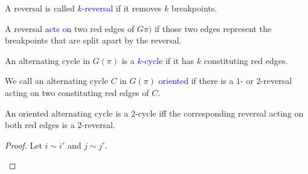 \documentclass{beamer}
\theoremstyle{definition}
\def\spadding{\vspace{0.25cm}}
\def\b{\textcolor{blue}}
\begin{document}
\begin{frame}

\begin{definition}
A reversal is called \b{$k$-reversal} if it removes $k$ breakpoints. \pause\spadding

A reversal \b{acts on} two red edges of $G\pi)$ if those two edges represent the breakpoints that are split apart by the reversal. \pause\spadding

An alternating cycle in $G(\pi)$ is a \b{$k$-cycle} if it has $k$ constituting red edges. \pause\spadding

We call an alternating cycle $C$ in $G(\pi)$ \b{oriented} if there is a $1$- or $2$-reversal acting on two constituting red edges of $C$.
\end{definition}

\end{frame}

\begin{frame}

\begin{lemma}
\label{lem:2}
An oriented alternating cycle is a $2$-cycle iff the corresponding reversal acting on both red edges is a $2$-reversal.
\end{lemma}\pause

\begin{proof}
Let $i \sim i'$ and $j \sim j'$.

\begin{center}
\end{center}
\end{proof}

\end{frame}
\end{document}
